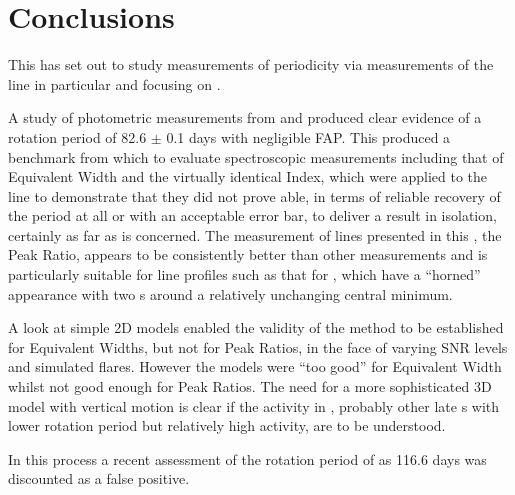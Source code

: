 \chapter{Conclusions}
\protect\label{chapter:conclusions}

This {\paperorthesis} has set out to study measurements of periodicity via measurements of the {\ha} line in particular
and focusing on \prox.

A study of photometric measurements from {\asas} and {\hst} produced clear evidence of a rotation period of 82.6 $\pm$
0.1 days with negligible FAP. This produced a benchmark from which to evaluate spectroscopic measurements including that
of Equivalent Width and the virtually identical {\ha} Index, which were applied to the {\ha} line to demonstrate that
they did not prove able, in terms of reliable recovery of the period at all or with an acceptable error bar, to deliver
a result in isolation, certainly as far as {\prox} is concerned. The measurement of lines presented in this
\paperorthesis, the Peak Ratio, appears to be consistently better than other measurements and is particularly suitable
for {\ha} line profiles such as that for \prox, which have a ``horned'' appearance with two \horn s around a relatively
unchanging central minimum.

A look at simple 2D models enabled the validity of the method to be established for Equivalent Widths, but not for Peak
Ratios, in the face of varying SNR levels and simulated flares. However the models were ``too good'' for Equivalent
Width whilst not good enough for Peak Ratios. The need for a more sophisticated 3D model with vertical motion is clear
if the activity in \prox, probably other late \rdwarf s with lower rotation period but relatively high activity, are to
be understood.

In this process a recent assessment of the rotation period of {\prox} as 116.6 days was discounted as a false positive.


